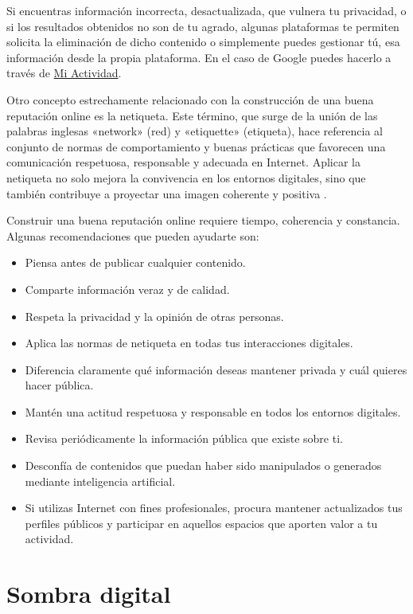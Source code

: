 \documentclass[
  spanish,
  a4paper,
  openany]{book}
\begin{document}
Si encuentras información incorrecta, desactualizada, que vulnera tu privacidad, o si los resultados obtenidos no son de tu agrado, algunas plataformas te permiten solicita la eliminación de dicho contenido o simplemente puedes gestionar tú, esa información desde la propia plataforma. En el caso de Google puedes hacerlo a través de \href{https://myactivity.google.com/myactivity}{Mi Actividad}.

Otro concepto estrechamente relacionado con la construcción de una buena reputación online es la netiqueta. Este término, que surge de la unión de las palabras inglesas «network» (red) y «etiquette» (etiqueta), hace referencia al conjunto de normas de comportamiento y buenas prácticas que favorecen una comunicación respetuosa, responsable y adecuada en Internet. Aplicar la netiqueta no solo mejora la convivencia en los entornos digitales, sino que también contribuye a proyectar una imagen coherente y positiva \citep{netiqueta}.

Construir una buena reputación online requiere tiempo, coherencia y constancia. Algunas recomendaciones que pueden ayudarte son:

\begin{itemize}
\item
  Piensa antes de publicar cualquier contenido.
\item
  Comparte información veraz y de calidad.
\item
  Respeta la privacidad y la opinión de otras personas.
\item
  Aplica las normas de netiqueta en todas tus interacciones digitales.
\item
  Diferencia claramente qué información deseas mantener privada y cuál quieres hacer pública.
\item
  Mantén una actitud respetuosa y responsable en todos los entornos digitales.
\item
  Revisa periódicamente la información pública que existe sobre ti.
\item
  Desconfía de contenidos que puedan haber sido manipulados o generados mediante inteligencia artificial.
\item
  Si utilizas Internet con fines profesionales, procura mantener actualizados tus perfiles públicos y participar en aquellos espacios que aporten valor a tu actividad.
\end{itemize}

\section{Sombra digital}\label{sombra-digital}
\end{document}

